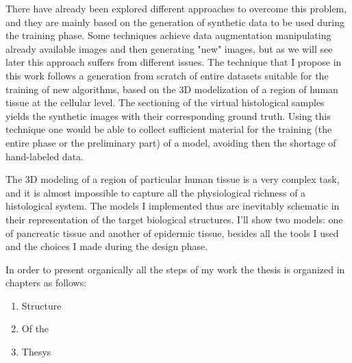 There have already been explored different approaches to overcome this problem, and they are mainly based on the generation of synthetic data to be used during the training phase. Some techniques achieve data augmentation manipulating already available images and then generating "new" images, but as we will see later this approach suffers from different issues. The technique that I propose in this work follows a generation from scratch of entire datasets suitable for the training of new algorithms, based on the 3D modelization of a region of human tissue at the cellular level. The sectioning of the virtual histological samples yields the synthetic images with their corresponding ground truth. Using this technique one would be able to collect sufficient material for the training (the entire phase or the preliminary part) of a model, avoiding then the shortage of hand-labeled data.

The 3D modeling of a region of particular human tissue is a very complex task, and it is almost impossible to capture all the physiological richness of a histological system. The models I implemented thus are inevitably schematic in their representation of the target biological structures. I'll show two models: one of pancreatic tissue and another of epidermic tissue, besides all the tools I used and the choices I made during the design phase.


In order to present organically all the steps of my work the thesis is organized in chapters as follows:

\begin{enumerate}
    \item Structure

    \item Of the

    \item Thesys
\end{enumerate}


